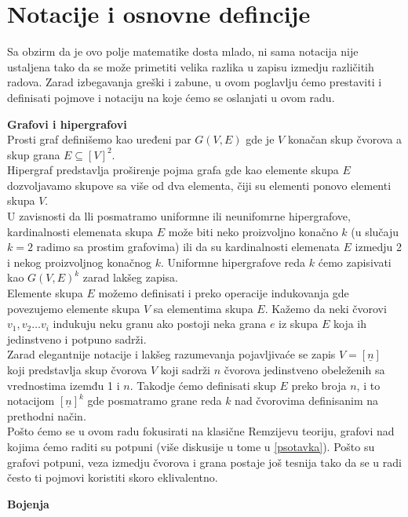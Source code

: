 \documentclass[a4paper]{article}
\begin{document}
	\section{Notacije i osnovne defincije}
	Sa obzirm da je ovo polje matematike dosta mlado, ni sama notacija nije ustaljena tako da se može primetiti velika razlika u zapisu izmedju različitih radova. Zarad izbegavanja greški i zabune, u ovom poglavlju ćemo prestaviti i definisati pojmove i notaciju na koje ćemo se oslanjati u ovom radu.
	\newline
	\begin{description}
		\item \textbf{Grafovi i hipergrafovi}\\
		Prosti graf definišemo kao uređeni par $G(V,E)$ gde je $V$ konačan skup čvorova a skup grana $E\subseteq[V]^2$. \\
		Hipergraf predstavlja proširenje pojma grafa gde kao elemente skupa $E$ dozvoljavamo skupove sa više od dva elementa, čiji su elementi ponovo elementi skupa $V$.\\ U zavisnosti da lli posmatramo uniformne ili neunifomrne hipergrafove, kardinalnosti elemenata skupa $E$ može biti neko proizvoljno konačno $k$ (u slučaju $k=2$ radimo sa prostim grafovima) ili da su kardinalnosti elemenata $E$ izmedju 2 i nekog proizvoljnog konačnog $k$. Uniformne hipergrafove reda $k$ ćemo zapisivati kao $G(V, E)^k$ zarad lakšeg zapisa. \\
		Elemente skupa $E$ možemo definisati i preko operacije indukovanja gde povezujemo elemente skupa $V$ sa elementima skupa $E$. Kažemo da neki čvorovi $v_1, v_2 \dots v_i$ indukuju neku granu ako postoji neka grana $e$ iz skupa $E$ koja ih jedinstveno i potpuno sadrži. \\%
		Zarad elegantnije notacije i lakšeg razumevanja pojavljivaće se zapis $V=[\underline{n}]$ koji predstavlja skup čvorova $V$ koji sadrži $n$ čvorova jedinstveno obeleženih sa vrednostima izemđu 1 i $n$. Takodje ćemo definisati skup $E$ preko broja $n$, i to notacijom $[\underline{n}]^k$ gde posmatramo grane reda $k$ nad čvorovima definisanim na prethodni način.
		\\
		Pošto ćemo se u ovom radu fokusirati na klasične Remzijevu teoriju, grafovi nad kojima ćemo raditi su potpuni (više diskusije u tome u \ref{psotavka}). Pošto su grafovi potpuni, veza izmedju čvorova i grana postaje još tesnija tako da se u radi često ti pojmovi koristiti skoro eklivalentno. \\
		\item \textbf{Bojenja} \\

\end{description}
\end{document}
